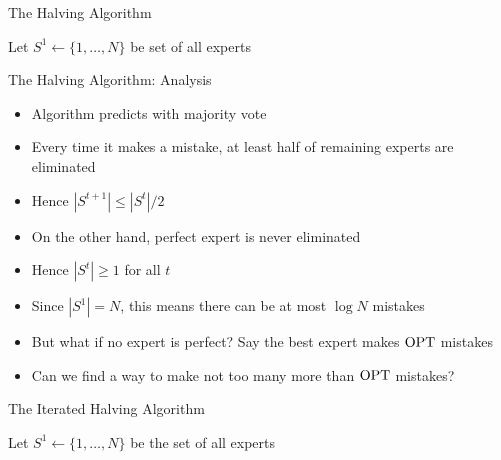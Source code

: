 \documentclass[11pt,aspectratio=169]{beamer}
\begin{document}
  
  \begin{frame}{The Halving Algorithm}
   \begin{algorithm*}[H]
    Let $S^1 \leftarrow \{1,\ldots,N\}$ be set of all experts\;
   \end{algorithm*}
  \end{frame}
  
  
  \begin{frame}{The Halving Algorithm: Analysis}
   \begin{itemize}[<+->]
   \setlength{\itemsep}{0.7em}
    \item Algorithm predicts with majority vote
    \item Every time it makes a mistake, at least half of remaining experts are eliminated
    \item Hence $|S^{t+1}| \leq |S^t|/2$
    \item On the other hand, perfect expert is never eliminated
    \item Hence $|S^t| \geq 1$ for all $t$
    \item Since $|S^1| = N$, this means there can be at most $\log N$ mistakes
    \item But what if no expert is perfect? Say the best expert makes ${\rm OPT}$ mistakes
    \item Can we find a way to make not too many more than ${\rm OPT}$ mistakes?
   \end{itemize}
  \end{frame}
  
  
  \begin{frame}{The Iterated Halving Algorithm}
   \begin{algorithm*}[H]
    Let $S^1 \leftarrow \{1,\ldots,N\}$ be the set of all experts\;
   \end{algorithm*}
  \end{frame}
  
\end{document}

